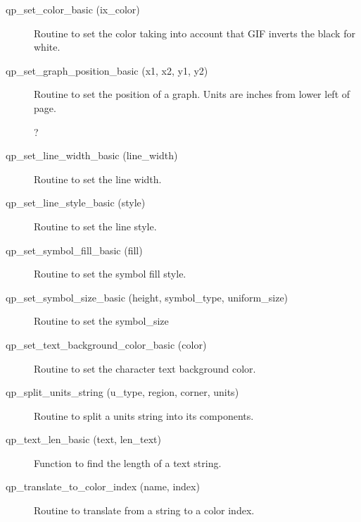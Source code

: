 \begin{description}
\label{r:qp.set.color.basic}
\item[qp_set_color_basic (ix_color)  ] \Newline 
Routine to set the color taking into account that GIF
inverts the black for white.

\label{r:qp.set.graph.position.basic}
\item[qp_set_graph_position_basic (x1, x2, y1, y2)] \Newline 
Routine to set the position of a graph.
Units are inches from lower left of page.

?
\label{r:qp.set.line.width.basic}
\item[qp_set_line_width_basic (line_width)] \Newline 
Routine to set the line width.

\label{r:qp.set.line.style.basic}
\item[qp_set_line_style_basic (style)] \Newline 
Routine to set the line style.

\label{r:qp.set.symbol.fill.basic}
\item[qp_set_symbol_fill_basic (fill)] \Newline 
Routine to set the symbol fill style.

\label{r:qp.set.symbol.size.basic}
\item[qp_set_symbol_size_basic (height, symbol_type, uniform_size)] \Newline 
Routine to set the symbol_size

\label{r:qp.set.text.background.color.basic}
\item[qp_set_text_background_color_basic (color)] \Newline 
Routine to set the character text background color.

\label{r:qp.split.units.string}
\item[qp_split_units_string (u_type, region, corner, units)] \Newline 
     Routine to split a units string into its components.

\label{r:qp.text.len.basic}
\item[qp_text_len_basic (text, len_text)] \Newline 
Function to find the length of a text string.

\label{r:qp.translate.to.color.index}
\item[qp_translate_to_color_index (name, index)] \Newline 
     Routine to translate from a string to a color index.

\end{description}

